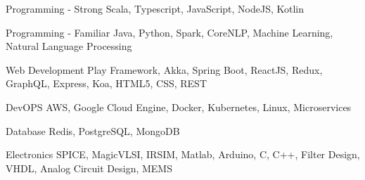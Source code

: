 

\begin{cvskills}

  \cvskill
    {Programming - Strong}
    {Scala, Typescript, JavaScript, NodeJS, Kotlin}  
    
  \cvskill
    {Programming - Familiar}
    {Java, Python, Spark, CoreNLP, Machine Learning, Natural Language Processing}  

  \cvskill
    {Web Development}
    {Play Framework, Akka, Spring Boot, ReactJS, Redux, GraphQL, Express, Koa, HTML5, CSS, REST}   

  \cvskill
    {DevOPS}
    {AWS, Google Cloud Engine, Docker, Kubernetes, Linux, Microservices}       

  \cvskill
    {Database}
    {Redis, PostgreSQL, MongoDB}         

  \cvskill
    {Electronics}
    {SPICE, MagicVLSI, IRSIM, Matlab, Arduino, C, C++, Filter Design, VHDL, Analog Circuit Design, MEMS}    

\end{cvskills}